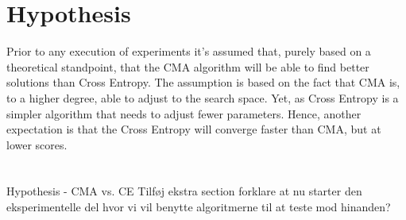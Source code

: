 \section{Hypothesis}

Prior to any execution of experiments it's assumed that, purely based 
on a theoretical standpoint, that the CMA algorithm will be able to 
find better solutions than Cross Entropy. The assumption is based 
on the fact that CMA is, to a higher degree, able to adjust to the 
search space. Yet, as Cross Entropy is a simpler algorithm that needs 
to adjust fewer parameters. Hence, another expectation is that the 
Cross Entropy will converge faster than CMA, but at lower scores.\\
\\
\\
Hypothesis - CMA vs. CE
Tilføj ekstra section forklare at nu starter den eksperimentelle del hvor vi vil benytte algoritmerne til at teste mod hinanden?
